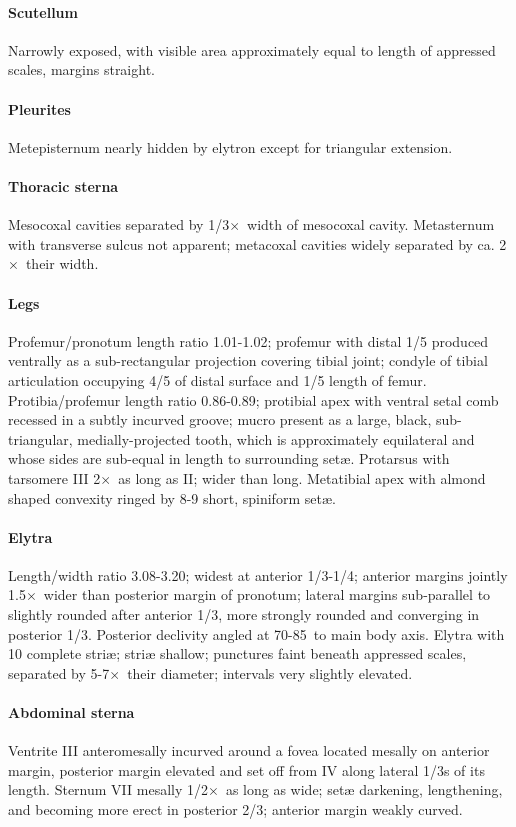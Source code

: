 \documentclass[fleqn,10pt,lineno]{wlpeerj} %
\newcommand{\td}{\textdegree~}
\newcommand{\x}{$\times$~}
\begin{document}
			\paragraph{Scutellum}
				Narrowly exposed, with visible area approximately equal to length of appressed scales, margins straight.
			\paragraph{Pleurites}
				Metepisternum nearly hidden by elytron except for triangular extension.
			\paragraph{Thoracic sterna} 
				Mesocoxal cavities separated by 1/3\x width of mesocoxal cavity. 
				Metasternum with transverse sulcus not apparent; metacoxal cavities widely separated by ca. 2\x their width.
			\paragraph{Legs}
				Profemur/pronotum length ratio 1.01-1.02; profemur with distal 1/5 produced ventrally as a sub-rectangular projection covering tibial joint; condyle of tibial articulation occupying 4/5 of distal surface and 1/5 length of femur. 
				Protibia/profemur length ratio 0.86-0.89; protibial apex with ventral setal comb recessed in a subtly incurved groove; mucro present as a large, black, sub-triangular, medially-projected tooth, which is approximately equilateral and whose sides are sub-equal in length to surrounding set{\ae}. 
				Protarsus with tarsomere III 2\x as long as II; wider than long. 
				Metatibial apex with almond shaped convexity ringed by 8-9 short, spiniform set{\ae}.
			\paragraph{Elytra}
				Length/width ratio 3.08-3.20; widest at anterior 1/3-1/4; anterior margins jointly 1.5\x wider than posterior margin of pronotum; lateral margins sub-parallel to slightly rounded after anterior 1/3, more strongly rounded and converging in posterior 1/3. 
				Posterior declivity angled at 70-85\td to main body axis. Elytra with 10 complete stri{\ae}; stri{\ae} shallow; punctures faint beneath appressed scales, separated by 5-7\x their diameter; intervals very slightly elevated.
			\paragraph{Abdominal sterna}
				Ventrite III anteromesally incurved around a fovea located mesally on anterior margin, posterior margin elevated and set off from IV along lateral 1/3s of its length. 
				Sternum VII mesally 1/2\x as long as wide; set{\ae} darkening, lengthening, and becoming more erect in posterior 2/3; anterior margin weakly curved.
\end{document}
